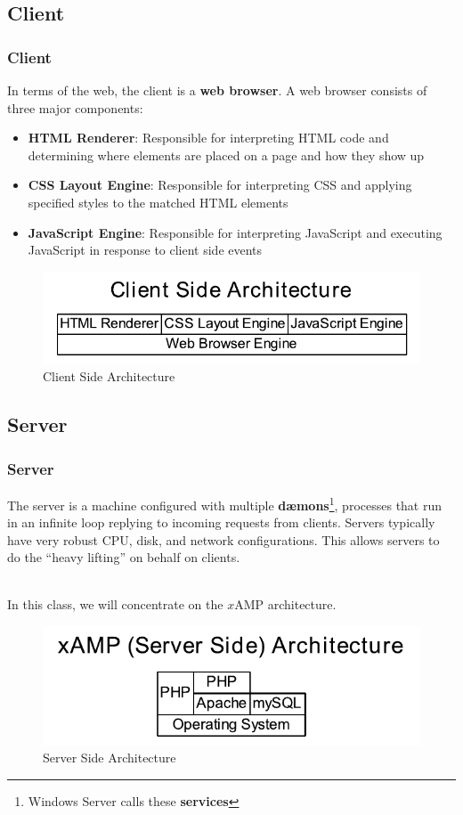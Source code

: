 \documentclass[aspectratio=169]{beamer}
\begin{document}
\subsection{Client}
\begin{frame}
\frametitle{Client}
In terms of the web, the client is a \textbf{web browser}. A web browser consists of three major components:
\begin{itemize}
	\item \textbf{HTML Renderer}: Responsible for interpreting HTML code and determining where elements are placed on a page and how they show up
	\item \textbf{CSS Layout Engine}: Responsible for interpreting CSS and applying specified styles to the matched HTML elements
	\item \textbf{JavaScript Engine}: Responsible for interpreting JavaScript and executing JavaScript in response to client side events
\end{itemize}
\begin{figure}
\includegraphics[scale=0.5]{../artifacts/client.pdf}
\caption{Client Side Architecture}
\label{fig:client}
\end{figure}
\end{frame}

\subsection{Server}
\begin{frame}
\frametitle{Server}
The server is a machine configured with multiple \textbf{d\ae mons}\footnote{Windows Server calls these \textbf{services}}, processes that run in an infinite loop replying to incoming requests from clients. Servers typically have very robust CPU, disk, and network configurations. This allows servers to do the ``heavy lifting'' on behalf on clients.

\mbox{}\\
In this class, we will concentrate on the $x$AMP architecture.

\begin{figure}
\includegraphics[scale=0.65]{../artifacts/xamp.pdf}
\caption{Server Side Architecture}
\label{fig:server}
\end{figure}
\end{frame}
\end{document}
